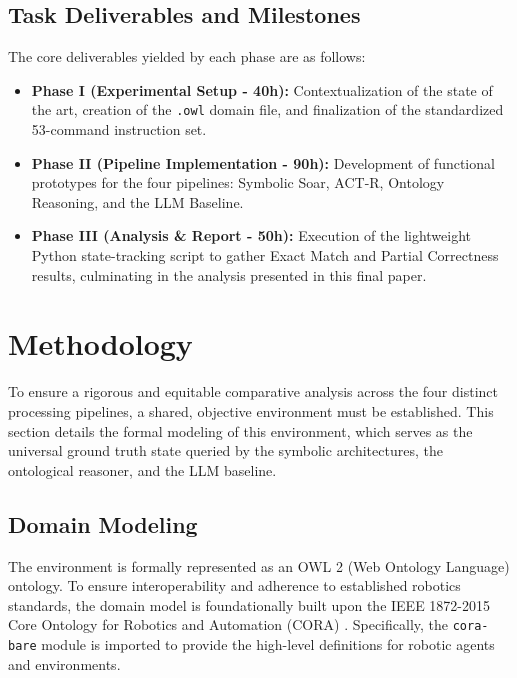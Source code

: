 \documentclass[a4paper]{article}
\begin{document}
\subsection{Task Deliverables and Milestones}
The core deliverables yielded by each phase are as follows:
\begin{itemize}
    \item \textbf{Phase I (Experimental Setup - 40h):} Contextualization of the state of the art, creation of the \texttt{.owl} domain file, and finalization of the standardized 53-command instruction set.
    \item \textbf{Phase II (Pipeline Implementation - 90h):} Development of functional prototypes for the four pipelines: Symbolic Soar, ACT-R, Ontology Reasoning, and the LLM Baseline.
    \item \textbf{Phase III (Analysis \& Report - 50h):} Execution of the lightweight Python state-tracking script to gather Exact Match and Partial Correctness results, culminating in the analysis presented in this final paper.
\end{itemize}

\section{Methodology}

To ensure a rigorous and equitable comparative analysis across the four distinct processing pipelines, a shared, objective environment must be established. This section details the formal modeling of this environment, which serves as the universal ground truth state queried by the symbolic architectures, the ontological reasoner, and the LLM baseline.

\subsection{Domain Modeling}

The environment is formally represented as an OWL 2 (Web Ontology Language) ontology. To ensure interoperability and adherence to established robotics standards, the domain model is foundationally built upon the IEEE 1872-2015 Core Ontology for Robotics and Automation (CORA) \cite{schlenoff2012ieee}. Specifically, the \texttt{cora-bare} module is imported to provide the high-level definitions for robotic agents and environments.
\end{document}

